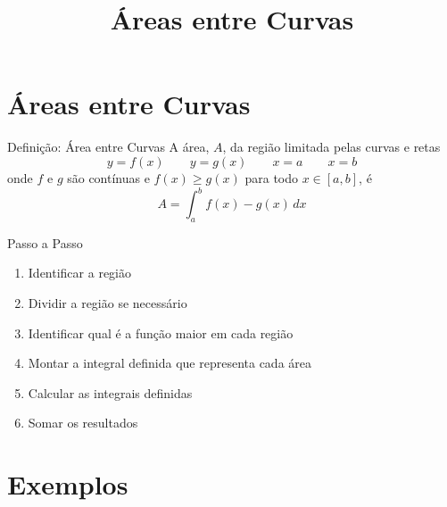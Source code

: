 
\usepackage{integracao_e_series}

\title{Áreas entre Curvas}



\addtitle

\section{Áreas entre Curvas}


\begin{frame}{Definição: Área entre Curvas}
  A área, $A$, da região limitada pelas curvas e retas
  \[
    y = f(x)  \qquad
    y = g(x)  \qquad
    x = a     \qquad
    x = b
  \]
  onde $f$ e $g$ são contínuas e
  $f(x) \geq g(x)$ para todo $x \in [a, b]$, é
  \[
    A = \int_a^b f(x) - g(x) \, dx
  \]
\end{frame}

\begin{frame}{Passo a Passo}
  \begin{enumerate}[<+->]
    \item Identificar a região
    \item Dividir a região se necessário
    \item Identificar qual é a função maior em cada região
    \item Montar a integral definida que representa cada área
    \item Calcular as integrais definidas
    \item Somar os resultados
  \end{enumerate}
\end{frame}

\section{Exemplos}

